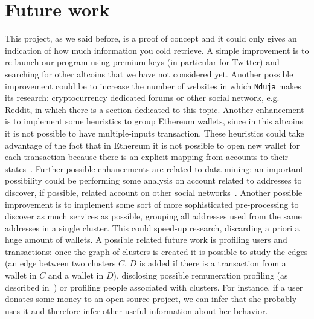 \section{Future work} \label{future}
This project, as we said before, is a proof of concept and it could only gives
an indication of how much information you cold retrieve. A simple improvement
is to re-launch our program using premium keys (in particular for Twitter) and
searching for other altcoins that we have not considered yet. Another possible
improvement could be to increase the number of websites in which \texttt{Nduja}
makes its research: cryptocurrency dedicated forums or other social network,
e.g. Reddit, in which there is a section dedicated to this topic. Another
enhancement is to implement some heuristics to group Ethereum wallets, since in
this altcoins it is not possible to have multiple-inputs transaction. These
heuristics could take advantage of the fact that in Ethereum it is
not possible to open new wallet for each transaction because there is an
explicit mapping from accounts to their states~\cite{bib:ethersok}.
Further possible enhancements are related to data mining: an important possibility could be
performing some analysis on account related to addresses to discover, if
possible, related account on other social networks~\cite{bib:osinference}.
Another possible improvement is to implement some sort of more sophisticated
pre-processing to discover as much services as possible, grouping all addresses
used from the same addresses in a single cluster. This could speed-up research,
discarding a priori a huge amount of wallets. A possible related future work is
profiling users and transactions: once the graph of clusters is created it is
possible to study the edges (an edge between two clusters $C$, $D$ is added
if there is a transaction from a wallet in $C$ and a wallet in $D$), disclosing
possible remuneration profiling (as described in~\cite{bib:fullDiscl}) or
profiling people associated with clusters.
For instance, if a user donates some money to an open source project,
we can infer that she probably uses it and therefore infer other useful
information about her behavior.

